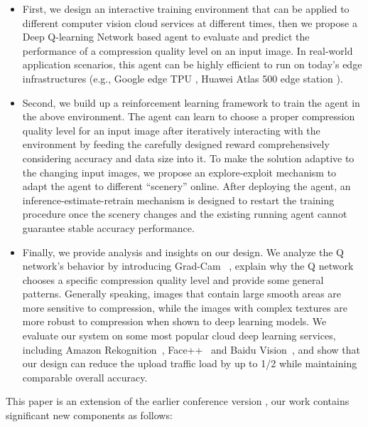 \begin{itemize} \item First, we design an interactive training environment that can be applied to different computer vision cloud services at different times, then we propose a Deep Q-learning Network based agent to evaluate and predict the performance of a compression quality level on an input image. In real-world application scenarios, this agent can be highly efficient to run on today's edge infrastructures (e.g., Google edge TPU \cite{google-tpu}, Huawei Atlas 500 edge station \cite{huawei-atlas500}).
	
	\item Second, we build up a reinforcement learning framework to train the agent in the above environment. The agent can learn to choose a proper compression quality level for an input image after iteratively interacting with the environment by feeding the carefully designed reward comprehensively considering accuracy and data size into it. To make the solution adaptive to the changing input images, we propose an explore-exploit mechanism to adapt the agent to different ``scenery'' online. After deploying the agent, an inference-estimate-retrain mechanism is designed to restart the training procedure once the scenery changes and the existing running agent cannot guarantee stable accuracy performance. 
	
	\item Finally, we provide analysis and insights on our design. We analyze the Q network's behavior by introducing Grad-Cam ~\cite{grad-cam}, explain why the Q network chooses a specific compression quality level and provide some general patterns. Generally speaking, images that contain large smooth areas are more sensitive to compression, while the images with complex textures are more robust to compression when shown to deep learning models. We evaluate our system on some most popular cloud deep learning services, including Amazon Rekognition~\cite{amazon_rekognition}, Face++~\cite{face++_service} and Baidu Vision~\cite{baidu_vision}, and show that our design can reduce the upload traffic load by up to 1/2 while maintaining comparable overall accuracy. \end{itemize}

This paper is an extension of the earlier conference version \cite{2019adacompress}, our work contains significant new components as follows:

